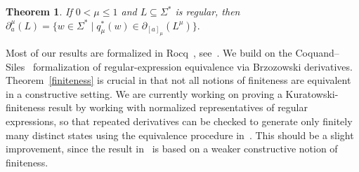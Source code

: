 \documentclass{easychair}
\newtheorem{theorem}{Theorem}
\begin{document}
\begin{theorem}\label{main} If $0<\mu\le1$ and $L\subseteq\Sigma^\ast$ is regular, then 
$
\partial_a^\mu(L)
=
\{w\in\Sigma^\ast\mid
q_\mu^\ast(w)\in
\partial_{[a]_\mu}(L^\mu)\}.
$
\end{theorem}


Most of our results are formalized in Rocq~\cite{Rocq}, see~\cite{OurRocqRepo}. We build on the Coquand--Siles~\cite{CoquandRegexEquality,RocqRegexpBrzozowski} formalization of
regular-expression equivalence via Brzozowski derivatives. Theorem~\ref{finiteness} is crucial in that not all notions of finiteness are equivalent in a constructive setting. We are currently working on proving a Kuratowski-finiteness result by working with normalized representatives of regular
expressions, so that repeated derivatives can be checked to generate only finitely many distinct
states using the equivalence procedure in~\cite{CoquandRegexEquality}. This should be a slight improvement, since the result in~\cite{CoquandRegexEquality} is based on a weaker constructive notion of finiteness.
\end{document}
